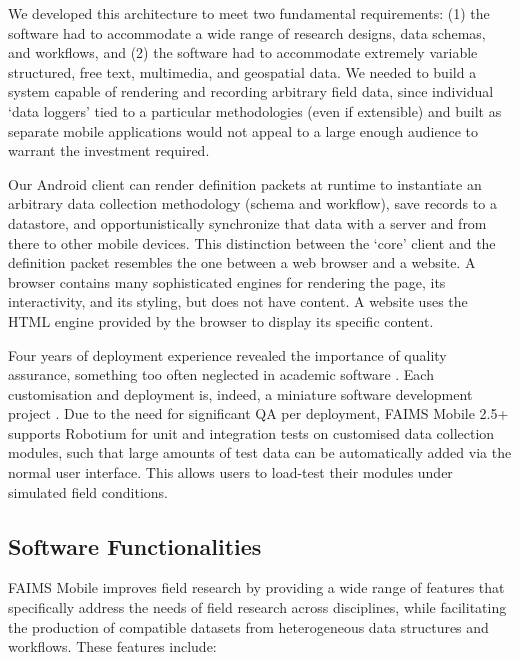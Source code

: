 \documentclass[preprint,12pt, a4paper]{elsarticle}
\begin{document}
We developed this architecture to meet two fundamental requirements: (1) the software had to accommodate a wide range of research designs, data schemas, and workflows, and (2) the software had to accommodate extremely variable structured, free text, multimedia, and geospatial data. We needed to build a system capable of rendering and recording arbitrary field data, since individual `data loggers' tied to a particular methodologies (even if extensible) and built as separate mobile applications would not appeal to a large enough audience to warrant the investment required. 

Our Android client can render definition packets at runtime to instantiate an arbitrary data collection methodology (schema and workflow), save records to a datastore, and opportunistically synchronize that data with a server and from there to other mobile devices. This distinction between the `core' client and the definition packet resembles the one between a web browser and a website. A browser contains many sophisticated engines for rendering the page, its interactivity, and its styling, but does not have content. A website uses the HTML engine provided by the browser to display its specific content. 

Four years of deployment experience revealed the importance of quality assurance, something too often neglected in academic software \cite{Might2010-fo, Sun2012-ub}. Each customisation and deployment is, indeed, a miniature software development project \cite{Sobotkova2016-mx}. Due to the need for significant QA per deployment, FAIMS Mobile 2.5+ supports Robotium for unit and integration tests on customised data collection modules, such that large amounts of test data can be automatically added via the normal user interface. This allows users to load-test their modules under simulated field conditions. 

\subsection{Software Functionalities}



FAIMS Mobile improves field research by providing a wide range of features that specifically address the needs of field research across disciplines, while facilitating the production of compatible datasets from  heterogeneous data structures and workflows. These features include:
\end{document}
